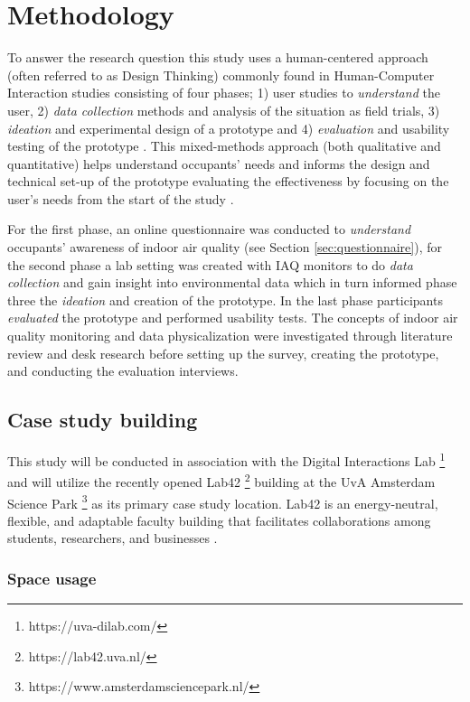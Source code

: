 \section{Methodology}
\label{sec:methodology}

To answer the research question this study uses a human-centered approach (often referred to as Design Thinking) commonly found in Human-Computer Interaction studies consisting of four phases; 1) user studies to \textit{understand} the user, 2) \textit{data collection} methods and analysis of the situation as field trials, 3) \textit{ideation} and experimental design of a prototype and 4) \textit{evaluation} and usability testing of the prototype \cite{jonathan_lazar_research_2017, zimmerman_research_2007}. This mixed-methods approach (both qualitative and quantitative)  helps understand occupants' needs and informs the design and technical set-up of the prototype evaluating the effectiveness by focusing on the user's needs from the start of the study \cite{rogers_moving_2017}. 

For the first phase, an online questionnaire was conducted to \textit{understand} occupants' awareness of indoor air quality (see Section \ref{sec:questionnaire}), for the second phase a lab setting was created with IAQ monitors to do \textit{data collection} and gain insight into environmental data which in turn informed phase three the \textit{ideation} and creation of the prototype. In the last phase participants \textit{evaluated} the prototype and performed usability tests. The concepts of indoor air quality monitoring and data physicalization were investigated through literature review and desk research before setting up the survey, creating the prototype, and conducting the evaluation interviews.

\subsection{Case study building}

This study will be conducted in association with the Digital Interactions Lab \footnote{https://uva-dilab.com/} and will utilize the recently opened Lab42 \footnote{https://lab42.uva.nl/} building at the UvA Amsterdam Science Park \footnote{https://www.amsterdamsciencepark.nl/} as its primary case study location. Lab42 is an energy-neutral, flexible, and adaptable faculty building that facilitates collaborations among students, researchers, and businesses \cite{benthem_2022}. 

\subsubsection{Space usage}

